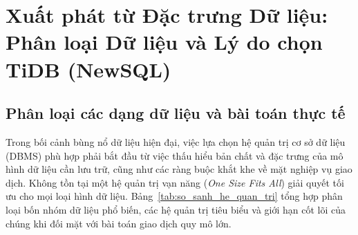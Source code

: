 

\section{Xuất phát từ Đặc trưng Dữ liệu: Phân loại Dữ liệu và Lý do chọn TiDB (NewSQL)}
\label{sec:phan_a_dac_trung_du_lieu}

\subsection{Phân loại các dạng dữ liệu và bài toán thực tế}

Trong bối cảnh bùng nổ dữ liệu hiện đại, việc lựa chọn hệ quản trị cơ sở dữ liệu (DBMS) phù hợp phải bắt đầu từ việc thấu hiểu bản chất và đặc trưng của mô hình dữ liệu cần lưu trữ, cũng như các ràng buộc khắt khe về mặt nghiệp vụ giao dịch. Không tồn tại một hệ quản trị vạn năng (\textit{One Size Fits All}) giải quyết tối ưu cho mọi loại hình dữ liệu. Bảng~\ref{tab:so_sanh_he_quan_tri} tổng hợp phân loại bốn nhóm dữ liệu phổ biến, các hệ quản trị tiêu biểu và giới hạn cốt lõi của chúng khi đối mặt với bài toán giao dịch quy mô lớn.

